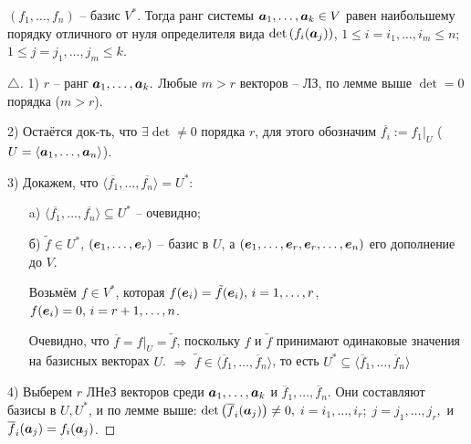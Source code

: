 \begin{to_thr} 
	$(f_1,\ldots,f_n)$ -- базис $V^*$. Тогда ранг системы $\mbox{\boldmath $a$}_1,\ldots,\mbox{\boldmath $a$}_k \in V$ равен наибольшему порядку отличного от нуля определителя вида $\det\left(f_i(\mbox{\boldmath $a$}_j)\right)$, $1 \leq i = i_1,\ldots,i_m \leq n$; $1 \leq j = j_1,\ldots, j_m \leq k$.
\end{to_thr}

\begin{proof}[$\triangle$]
	1) $r$ -- ранг $\mbox{\boldmath $a$}_1,\ldots,\mbox{\boldmath $a$}_k.$ Любые $m>r$ векторов -- ЛЗ, по лемме выше $\det = 0$ порядка ($m>r$).

	2) Остаётся док-ть, что $\exists \det \neq 0$ порядка $r$, для этого обозначим $\overline{f_i}:= f_1 \big|_U$ ($U = \langle \mbox{\boldmath $a$}_1,\ldots,\mbox{\boldmath $a$}_n\rangle$).

	3) Докажем, что $\langle \overline{f_1}, \ldots, \overline{f_n}\rangle = U^*$:
	\begin{enumerate}
		\item[a)] $\langle \overline{f_1}, \ldots, \overline{f_n}\rangle \subseteq U^*$ -- очевидно;
		\item[б)] $\tilde{f} \in U^*$, $(\mbox{\boldmath $e$}_1,\ldots,\mbox{\boldmath $e$}_r)$ -- базис в $U$, а $(\mbox{\boldmath $e$}_1,\ldots,\mbox{\boldmath $e$}_r, \mbox{\boldmath $e$}_r,\ldots, \mbox{\boldmath $e$}_n)$ его дополнение до $V$.

		Возьмём $f \in V^*$, которая $f(\mbox{\boldmath $e$}_i) = \tilde f(\mbox{\boldmath $e$}_i), \, i = 1,\ldots,r$, $f(\mbox{\boldmath $e$}_i)=0, \, i = r+1,\ldots,n$.

		Очевидно, что $\overline{f} = f \big|_U = \tilde{f}$, поскольку $f$ и $\tilde{f}$ принимают одинаковые значения на базисных векторах $U$. $\Rightarrow$ $\tilde{f} \in \langle \overline{f}_1,\ldots, \overline{f}_n\rangle$, то есть $U^* \subseteq \langle \overline{f}_1,\ldots, \overline{f}_n\rangle$
	\end{enumerate}

	4) Выберем $r$ ЛНеЗ векторов среди $\mbox{\boldmath $a$}_1, \ldots, \mbox{\boldmath $a$}_k$ и $\overline{f}_1,\ldots,\overline{f}_n$. Они составляют базисы в $U, U^*$, и по лемме выше:
	$\det\left(\overline{f}_i(\mbox{\boldmath $a$}_j)\right) \neq 0,$ $ i = i_1,\ldots, i_r;\; j = j_1,\ldots,j_r,$ и $\overline{f}_i(\mbox{\boldmath $a$}_j) = f_i(\mbox{\boldmath $a$}_j)$.
\end{proof}